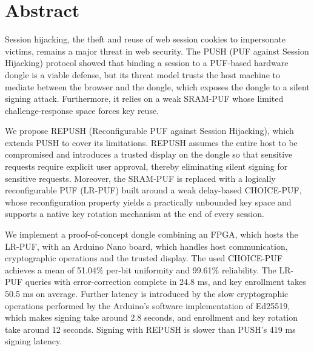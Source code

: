 
\thispagestyle{plain}

\section*{Abstract}



Session hijacking, the theft and reuse of web session cookies to impersonate victims, remains a major threat in web security. The PUSH (PUF against Session Hijacking) protocol showed that binding a session to a PUF-based hardware dongle is a viable defense, but its threat model trusts the host machine to mediate between the browser and the dongle, which exposes the dongle to a silent signing attack. Furthermore, it relies on a weak SRAM-PUF whose limited challenge-response space forces key reuse.

We propose REPUSH (Reconfigurable PUF against Session Hijacking), which extends PUSH to cover its limitations. REPUSH assumes the entire host to be compromised and introduces a trusted display on the dongle so that sensitive requests require explicit user approval, thereby eliminating silent signing for sensitive requests. Moreover, the SRAM-PUF is replaced with a logically reconfigurable PUF (LR-PUF) built around a weak delay-based CHOICE-PUF, whose reconfiguration property yields a practically unbounded key space and supports a native key rotation mechanism at the end of every session. 

We implement a proof-of-concept dongle combining an FPGA, which hosts the LR-PUF, with an Arduino Nano board, which handles host communication, cryptographic operations and the trusted display. The used CHOICE-PUF achieves a mean of 51.04\% per-bit uniformity and 99.61\% reliability. The LR-PUF queries with error-correction complete in 24.8 ms, and key enrollment takes 50.5 ms on average. Further latency is introduced by the slow cryptographic operations performed by the Arduino's software implementation of Ed25519, which makes signing take around 2.8 seconds, and enrollment and key rotation take around 12 seconds. Signing with REPUSH is slower than PUSH's 419 ms signing latency. 

